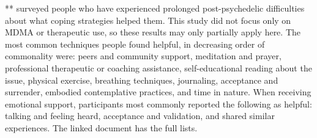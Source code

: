 \documentclass[12pt,letterpaper]{book}
\begin{document}
**\textcite{robinson2024coming} surveyed people who have experienced prolonged post-psychedelic difficulties about what coping strategies helped them. This study did not focus only on MDMA or therapeutic use, so these results may only partially apply here. The most common techniques people found helpful, in decreasing order of commonality were: peers and community support, meditation and prayer, professional therapeutic or coaching assistance, self-educational reading about the issue, physical exercise, breathing techniques, journaling, acceptance and surrender, embodied contemplative practices, and time in nature. When receiving emotional support, participants most commonly reported the following as helpful: talking and feeling heard, acceptance and validation, and shared similar experiences. The linked document has the full lists.
\end{document}
